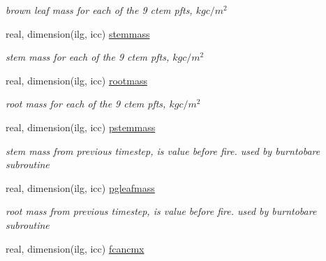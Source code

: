 \begin{DoxyCompactItemize}
\begin{DoxyCompactList}\small\item\em brown leaf mass for each of the 9 ctem pfts, $kg c/m^2$ \end{DoxyCompactList}\item 
\hypertarget{structctem__statevars_1_1veg__gat_af58d6f87e01504be5db93a6a1cec47f9}{}real, dimension(ilg, icc) \hyperlink{structctem__statevars_1_1veg__gat_af58d6f87e01504be5db93a6a1cec47f9}{stemmass}\label{structctem__statevars_1_1veg__gat_af58d6f87e01504be5db93a6a1cec47f9}

\begin{DoxyCompactList}\small\item\em stem mass for each of the 9 ctem pfts, $kg c/m^2$ \end{DoxyCompactList}\item 
\hypertarget{structctem__statevars_1_1veg__gat_a906c1413a7cee36cca69fb46e8f13ffd}{}real, dimension(ilg, icc) \hyperlink{structctem__statevars_1_1veg__gat_a906c1413a7cee36cca69fb46e8f13ffd}{rootmass}\label{structctem__statevars_1_1veg__gat_a906c1413a7cee36cca69fb46e8f13ffd}

\begin{DoxyCompactList}\small\item\em root mass for each of the 9 ctem pfts, $kg c/m^2$ \end{DoxyCompactList}\item 
\hypertarget{structctem__statevars_1_1veg__gat_af687a4b8b9acaefe6309d514c31375ff}{}real, dimension(ilg, icc) \hyperlink{structctem__statevars_1_1veg__gat_af687a4b8b9acaefe6309d514c31375ff}{pstemmass}\label{structctem__statevars_1_1veg__gat_af687a4b8b9acaefe6309d514c31375ff}

\begin{DoxyCompactList}\small\item\em stem mass from previous timestep, is value before fire. used by burntobare subroutine \end{DoxyCompactList}\item 
\hypertarget{structctem__statevars_1_1veg__gat_a04b66cd94d6206be647d165460f1e2bf}{}real, dimension(ilg, icc) \hyperlink{structctem__statevars_1_1veg__gat_a04b66cd94d6206be647d165460f1e2bf}{pgleafmass}\label{structctem__statevars_1_1veg__gat_a04b66cd94d6206be647d165460f1e2bf}

\begin{DoxyCompactList}\small\item\em root mass from previous timestep, is value before fire. used by burntobare subroutine \end{DoxyCompactList}\item 
\hypertarget{structctem__statevars_1_1veg__gat_aeab49379a26d2e4ebe62baa8a7d8d21c}{}real, dimension(ilg, icc) \hyperlink{structctem__statevars_1_1veg__gat_aeab49379a26d2e4ebe62baa8a7d8d21c}{fcancmx}\label{structctem__statevars_1_1veg__gat_aeab49379a26d2e4ebe62baa8a7d8d21c}


\end{DoxyCompactItemize}
